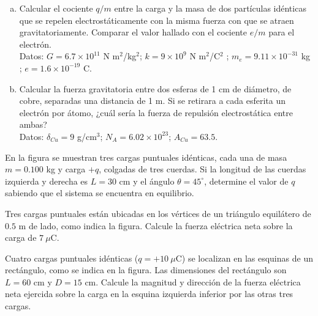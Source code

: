 \documentclass[problemas]{guia}
\begin{document}
 
\maketitle

\begin{problema}[]{}
    \begin{enumerate}[(a)]
        \item Calcular el cociente $q/m$ entre la carga y la masa de dos 
            partículas idénticas que se repelen electrostáticamente con la 
            misma fuerza con que se atraen gravitatoriamente. Comparar el valor
            hallado con el cociente $e/m$ para el electrón. \\

            Datos: $G = 6.7\times10^{11}$ N m$^2$/kg$^2$;  
            $k = 9\times10^9$ N m$^2$/C$^2$ ;  $m_e = 9.11\times10^{-31}$ kg ;
            $e = 1.6\times10^{-19}$ C. \\

        \item Calcular la fuerza gravitatoria entre dos esferas de 1 cm de 
            diámetro, de cobre, separadas una distancia de 1 m. Si se retirara
            a cada esferita un electrón por átomo, ¿cuál sería la fuerza de 
            repulsión electrostática entre ambas? \\

            Datos: $\delta_{Cu} = 9$ g/cm$^3$; $N_A = 6.02\times10^{23}$; 
            $A_{Cu} = 63.5$.
    \end{enumerate}
\end{problema}

\begin{problema}{}
    En la figura se muestran tres cargas puntuales idénticas, cada una de masa 
    $m = 0.100$ kg y carga $+q$, colgadas de tres cuerdas. Si la longitud de 
    las cuerdas izquierda y derecha es $L = 30$ cm y el ángulo 
    $\theta = 45^\circ$, determine el valor de $q$ sabiendo que el sistema se 
    encuentra en equilibrio.
\end{problema}

\begin{problema}{}
    Tres cargas puntuales están ubicadas en los vértices de un triángulo 
    equilátero de $0.5$ m de lado, como indica la figura. Calcule la fuerza 
    eléctrica neta sobre la carga de $7~\mu$C.
\end{problema}

\begin{problema}{}
    Cuatro cargas puntuales idénticas ($q=+10~\mu$C) se localizan en las 
    esquinas de un rectángulo, como se indica en la figura. Las dimensiones 
    del rectángulo son $L = 60$ cm y $D = 15$ cm. Calcule la magnitud y 
    dirección de la fuerza eléctrica neta ejercida sobre la carga en la esquina
    izquierda inferior por las otras tres cargas.
\end{problema}
\end{document}
